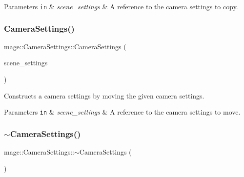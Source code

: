 \begin{DoxyParams}[1]{Parameters}
\mbox{\tt in}  & {\em scene\+\_\+settings} & A reference to the camera settings to copy. \\
\hline
\end{DoxyParams}
\hypertarget{classmage_1_1_camera_settings_a006a0cb2758137b14c65c4788f25d41e}{}\label{classmage_1_1_camera_settings_a006a0cb2758137b14c65c4788f25d41e} 
\subsubsection{\texorpdfstring{Camera\+Settings()}{CameraSettings()}\hspace{0.1cm}{\footnotesize\ttfamily [3/3]}}
{\footnotesize\ttfamily mage\+::\+Camera\+Settings\+::\+Camera\+Settings (\begin{DoxyParamCaption}\item[{\hyperlink{classmage_1_1_camera_settings}{Camera\+Settings} \&\&}]{scene\+\_\+settings }\end{DoxyParamCaption})\hspace{0.3cm}{\ttfamily [default]}}

Constructs a camera settings by moving the given camera settings.


\begin{DoxyParams}[1]{Parameters}
\mbox{\tt in}  & {\em scene\+\_\+settings} & A reference to the camera settings to move. \\
\hline
\end{DoxyParams}
\hypertarget{classmage_1_1_camera_settings_a738a93dc2e1aed2cac7a58af658984f3}{}\label{classmage_1_1_camera_settings_a738a93dc2e1aed2cac7a58af658984f3} 
\subsubsection{\texorpdfstring{$\sim$\+Camera\+Settings()}{~CameraSettings()}}
{\footnotesize\ttfamily mage\+::\+Camera\+Settings\+::$\sim$\+Camera\+Settings (\begin{DoxyParamCaption}{ }\end{DoxyParamCaption})\hspace{0.3cm}{\ttfamily [default]}}


